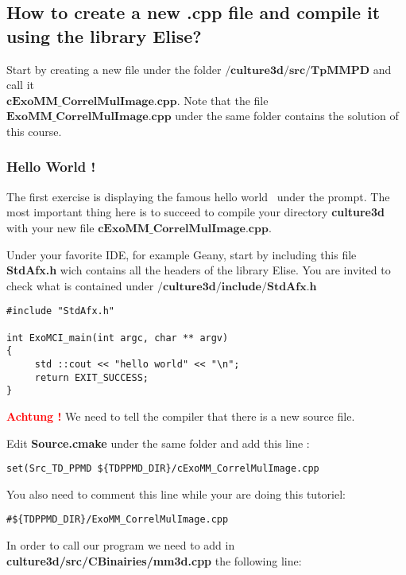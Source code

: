\documentclass[a4paper]{book}
\begin{document}
\subsection{How to create a new .cpp file and compile it using the library Elise?}
Start by creating a new file under the folder $\textbf{/culture3d/src/TpMMPD}$ and call it \\$\textbf{cExoMM\_CorrelMulImage.cpp}$. Note that the file $\textbf{ExoMM\_CorrelMulImage.cpp}$ under the same folder contains the solution of this course.
\subsubsection{Hello World !}
The first exercise is displaying the famous \og hello world \fg\ under the prompt. The most important thing here is to succeed to compile your directory \textbf{culture3d} with your new file  $\textbf{cExoMM\_CorrelMulImage.cpp}$.\newline


Under your favorite IDE, for example Geany, start by including this file \textbf{StdAfx.h} wich contains all the headers of the library Elise. You are invited to check what is contained under $\textbf{/culture3d/include/StdAfx.h}$ \newline

\begin{lstlisting}
#include "StdAfx.h" 

int ExoMCI_main(int argc, char ** argv) 
{ 
     std ::cout << "hello world" << "\n";
     return EXIT_SUCCESS; 
}
\end{lstlisting}

\textbf{\textcolor{red}{Achtung !}} We need to tell the compiler that there is a new source file. 

Edit \textbf{Source.cmake} under the same folder and add this line : \newline

\begin{lstlisting}
set(Src_TD_PPMD ${TDPPMD_DIR}/cExoMM_CorrelMulImage.cpp
\end{lstlisting}

You also need to comment this line while your are doing this tutoriel:
\begin{lstlisting}
#${TDPPMD_DIR}/ExoMM_CorrelMulImage.cpp
\end{lstlisting}

In order to call our program we need to add in \textbf{culture3d/src/CBinairies/mm3d.cpp} the following line: \newline
\end{document}
